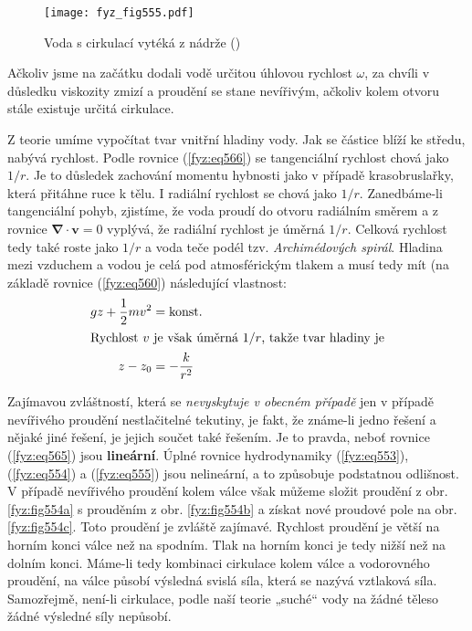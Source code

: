     \begin{figure}[ht!] %
      \centering
      \texttt{[image: fyz\_fig555.pdf]}
      \caption{Voda s cirkulací vytéká z nádrže
               (\cite[s.~752]{Feynman02})}
      \label{fyz:fig555}
    \end{figure}
    
    Ačkoliv jsme na začátku dodali vodě určitou úhlovou rychlost \(\omega\), za chvíli v důsledku 
    viskozity zmizí a proudění se stane nevířivým, ačkoliv kolem otvoru stále existuje určitá 
    cirkulace.
    
    Z teorie umíme vypočítat tvar vnitřní hladiny vody. Jak se částice blíží ke středu, nabývá 
    rychlost. Podle rovnice (\ref{fyz:eq566}) se tangenciální rychlost chová jako \(1/r\). Je to 
    důsledek zachování momentu hybnosti jako v případě krasobruslařky, která přitáhne ruce k tělu. 
    I radiální rychlost se chová jako \(1/r\). Zanedbáme-li tangenciální pohyb, zjistíme, že voda 
    proudí do otvoru radiálním směrem a z rovnice \(\symbf{\nabla}\cdot\bm{v} = 0\) vyplývá, že 
    radiální rychlost je úměrná \(1/r\). Celková rychlost tedy také roste jako \(1/r\) a voda teče 
    podél tzv. \emph{Archimédových spirál}. Hladina mezi vzduchem a vodou je celá pod atmosférickým 
    tlakem a musí tedy mít (na základě rovnice (\ref{fyz:eq560}) následující vlastnost:
    \begin{align*}
      gz + \dfrac{1}{2}mv^2 &= \text{konst}.                                           \\
      \shortintertext{Rychlost \(v\) je však úměrná \(1/r\), takže tvar hladiny je}
      z - z_0               &= - \dfrac{k}{r^2}
    \end{align*}
    
    Zajímavou zvláštností, která se \emph{nevyskytuje v obecném případě} jen v případě nevířivého 
    proudění nestlačitelné tekutiny, je fakt, že známe-li jedno řešení a nějaké jiné řešení, je 
    jejich součet také řešením. Je to pravda, neboť rovnice (\ref{fyz:eq565}) jsou 
    \textbf{lineární}. Úplné rovnice hydrodynamiky (\ref{fyz:eq553}), (\ref{fyz:eq554}) a 
    (\ref{fyz:eq555}) jsou nelineární, a to způsobuje podstatnou odlišnost. V případě nevířivého 
    proudění kolem válce však můžeme složit proudění z obr. \ref{fyz:fig554a} s prouděním z obr. 
    \ref{fyz:fig554b} a získat nové proudové pole na obr. \ref{fyz:fig554c}. Toto proudění je 
    zvláště zajímavé. Rychlost proudění je větší na horním konci válce než na spodním. Tlak na 
    horním konci je tedy nižší než na dolním konci. Máme-li tedy kombinaci cirkulace kolem válce a 
    vodorovného proudění, na válce působí výsledná svislá síla, která se nazývá vztlaková síla. 
    Samozřejmě, není-li cirkulace, podle naší teorie „suché“ vody na žádné těleso žádné výsledné 
    síly nepůsobí.
    
